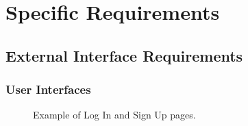 \chapter{Specific Requirements}

\section{External Interface Requirements}

\subsection{User Interfaces}

\begin{figure}[H]
	\centering     %
	\caption{Example of Log In and Sign Up pages.}
\end{figure}

